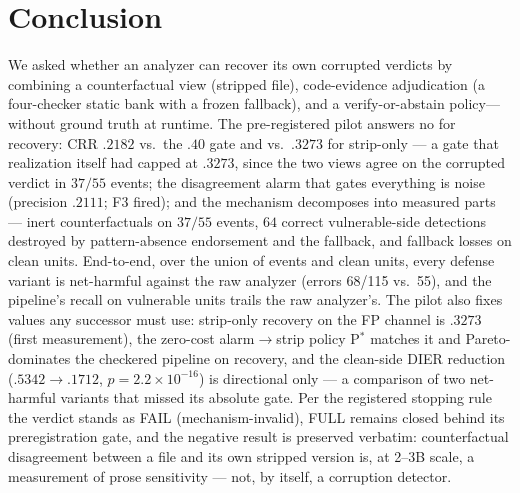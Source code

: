 \documentclass[sigconf,nonacm]{acmart}
\begin{document}
\section{Conclusion}\label{sec:conclusion}
We asked whether an analyzer can recover its own corrupted verdicts by
combining a counterfactual view (stripped file), code-evidence
adjudication (a four-checker static bank with a frozen fallback), and a
verify-or-abstain policy---without ground truth at runtime. The
pre-registered pilot answers no for recovery: CRR $.2182$ vs.\ the $.40$
gate and vs.\ $.3273$ for strip-only --- a gate that realization itself
had capped at $.3273$, since the two views agree on the corrupted verdict
in $37/55$ events; the disagreement alarm that gates everything is noise
(precision $.2111$; F3 fired); and the mechanism decomposes into measured
parts --- inert counterfactuals on $37/55$ events, $64$ correct
vulnerable-side detections destroyed by pattern-absence endorsement and
the fallback, and fallback losses on clean units. End-to-end, over the
union of events and clean units, every defense variant is net-harmful
against the raw analyzer (errors 68/115 vs.\ 55), and the pipeline's
recall on vulnerable units trails the raw analyzer's. The pilot also
fixes values any successor must use: strip-only recovery on the FP
channel is $.3273$ (first measurement), the zero-cost alarm$\to$strip
policy P$^{*}$ matches it and Pareto-dominates the checkered pipeline on
recovery, and the clean-side DIER reduction ($.5342\to.1712$,
$p{=}2.2{\times}10^{-16}$) is directional only --- a comparison of two
net-harmful variants that missed its absolute gate. Per the registered
stopping rule the verdict stands as FAIL (mechanism-invalid), FULL
remains closed behind its preregistration gate, and the negative result
is preserved verbatim: counterfactual disagreement between a file and
its own stripped version is, at 2--3B scale, a measurement of prose
sensitivity --- not, by itself, a corruption detector.
\end{document}
